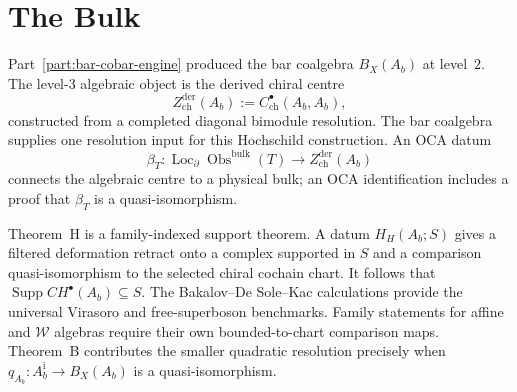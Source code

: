 \documentclass[11pt]{memoir}
\newcommand{\ChirHoch}{CH} %
\begin{document}






%
%
%
%

\part{The Bulk}
\label{part:bulk}

\noindent
Part~\ref{part:bar-cobar-engine} produced the bar coalgebra
$B_X(A_b)$ at level~$2$.  The level-$3$ algebraic object is the
derived chiral centre
\[
 Z^{\mathrm{der}}_{\mathrm{ch}}(A_b)
 :=C^\bullet_{\mathrm{ch}}(A_b,A_b),
\]
constructed from a completed diagonal bimodule resolution.  The bar
coalgebra supplies one resolution input for this Hochschild
construction.  An OCA datum
\[
 \beta_T\colon
 \operatorname{Loc}_{\partial}\operatorname{Obs}^{\mathrm{bulk}}(T)
 \longrightarrow Z^{\mathrm{der}}_{\mathrm{ch}}(A_b)
\]
connects the algebraic centre to a physical bulk; an OCA
identification includes a proof that $\beta_T$ is a
quasi-isomorphism.

Theorem~H is a family-indexed support theorem.  A datum
$H_H(A_b;S)$ gives a filtered deformation retract onto a complex
supported in $S$ and a comparison quasi-isomorphism to the selected
chiral cochain chart.  It follows that
$\operatorname{Supp}\ChirHoch^\bullet(A_b)\subseteq S$.
The Bakalov--De Sole--Kac calculations provide the universal
Virasoro and free-superboson benchmarks.  Family statements for
affine and $\mathcal W$ algebras require their own bounded-to-chart
comparison maps.  Theorem~B contributes the smaller quadratic
resolution precisely when
$q_{A_b}\colon A_b^{\mathrm i}\to B_X(A_b)$ is a
quasi-isomorphism.
\end{document}
